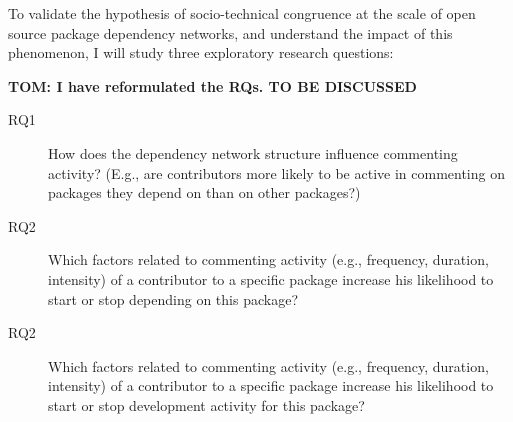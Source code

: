 To validate the hypothesis of socio-technical congruence at the scale of open source package dependency networks, and understand the impact of this phenomenon, I will study three exploratory research questions: 

\textbf{TOM: I have reformulated the RQs. TO BE DISCUSSED}
\begin{description}
\item[RQ1] How does the dependency network structure influence commenting activity? (E.g., are contributors more likely to be active in commenting on packages they depend on than on other packages?)
\item[RQ2] Which factors related to commenting activity (e.g., frequency, duration, intensity) of a contributor to a specific package increase his likelihood to start or stop depending on this package?
\item[RQ2] Which factors related to commenting activity (e.g., frequency, duration, intensity) of a contributor to a specific package increase his likelihood to start or stop development activity for this package?
\end{description}